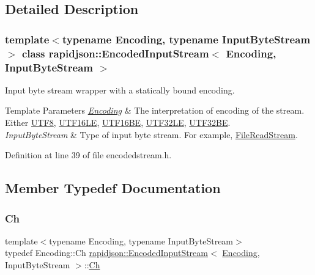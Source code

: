 \subsection{Detailed Description}
\subsubsection*{template$<$typename Encoding, typename Input\+Byte\+Stream$>$\newline
class rapidjson\+::\+Encoded\+Input\+Stream$<$ Encoding, Input\+Byte\+Stream $>$}

Input byte stream wrapper with a statically bound encoding. 


\begin{DoxyTemplParams}{Template Parameters}
{\em \mbox{\hyperlink{classrapidjson_1_1_encoding}{Encoding}}} & The interpretation of encoding of the stream. Either \mbox{\hyperlink{structrapidjson_1_1_u_t_f8}{U\+T\+F8}}, \mbox{\hyperlink{structrapidjson_1_1_u_t_f16_l_e}{U\+T\+F16\+LE}}, \mbox{\hyperlink{structrapidjson_1_1_u_t_f16_b_e}{U\+T\+F16\+BE}}, \mbox{\hyperlink{structrapidjson_1_1_u_t_f32_l_e}{U\+T\+F32\+LE}}, \mbox{\hyperlink{structrapidjson_1_1_u_t_f32_b_e}{U\+T\+F32\+BE}}. \\
\hline
{\em Input\+Byte\+Stream} & Type of input byte stream. For example, \mbox{\hyperlink{classrapidjson_1_1_file_read_stream}{File\+Read\+Stream}}. \\
\hline
\end{DoxyTemplParams}


Definition at line 39 of file encodedstream.\+h.



\subsection{Member Typedef Documentation}
\mbox{\label{classrapidjson_1_1_encoded_input_stream_ac1cf99de822b615beaa5e33ac989a20a}} 
\subsubsection{\texorpdfstring{Ch}{Ch}}
{\footnotesize\ttfamily template$<$typename Encoding, typename Input\+Byte\+Stream$>$ \\
typedef Encoding\+::\+Ch \mbox{\hyperlink{classrapidjson_1_1_encoded_input_stream}{rapidjson\+::\+Encoded\+Input\+Stream}}$<$ \mbox{\hyperlink{classrapidjson_1_1_encoding}{Encoding}}, Input\+Byte\+Stream $>$\+::\mbox{\hyperlink{classrapidjson_1_1_encoded_input_stream_ac1cf99de822b615beaa5e33ac989a20a}{Ch}}}



